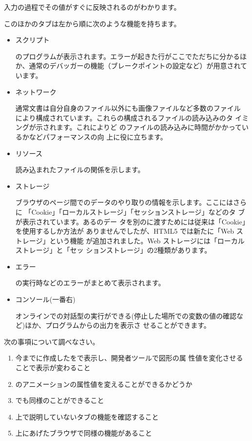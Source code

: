 入力の過程でその値がすぐに反映されるのがわかります。

このほかのタブは左から順に次のような機能を持ちます。
\begin{itemize}
 \item スクリプト

\JS のプログラムが表示されます。エラーが起きた行がここでただちに分かるほ
       か、通常のデバッガーの機能（ブレークポイントの設定など）が用意されています。
 \item ネットワーク

通常\HTML 文書は自分自身のファイル以外にも画像ファイルなど多数のファイル
       により構成されています。これらの構成されるファイルの読み込みのタ
       イミングが示されます。これによりど
       のファイルの読み込みに時間がかかっているかなどパフォーマンスの向
       上に役に立ちます。
 \item リソース

読み込まれたファイルの関係を示します。
 \item ストレージ

ブラウザのページ間でのデータのやり取りの情報を示します。ここにはさらに
       「Cookie」「ローカルストレージ」「セッションストレージ」などのタ
       ブが表示されています。ある\HTML のデー
       タを別の\HTML に渡すためには従来は「Cookie」を使用するしか方法が
       ありませんでしたが、HTML5 では新たに「Web ストレージ」という機能
       が追加されました。Web ストレージには「ローカルストレージ」と「セッ
       ションストレージ」の2種類があります。
 \item エラー

\JS の実行時などのエラーがまとめて表示されます。
 \item コンソール(一番右)

オンラインで\JS の対話型の実行ができる(停止した場所での変数の値の確認な
       ど)ほか、プログラムからの出力を表示さ
       せることができます。
\end{itemize}

\begin{Problem}\upshape
次の事項について調べなさい。
\begin{enumerate}
 \item  今までに作成した\SVG を\Opera で表示し、開発者ツールで図形の属
	性値を変化させることで表示が変わること
 \item \SVG のアニメーションの属性値を変えることができるかどうか
 \item \HTML でも同様のことができること
 \item 上で説明していないタブの機能を確認すること
 \item 上にあげたブラウザで同様の機能があること
\end{enumerate}
\end{Problem}

